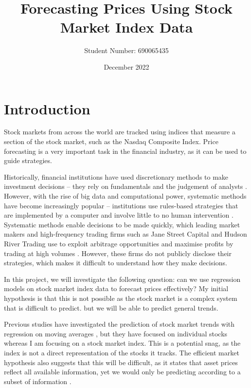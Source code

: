 \documentclass[a4paper, 11pt]{article}
\begin{document}
\title{Forecasting Prices Using Stock Market Index Data}
\author{Student Number: 690065435}
\date{December 2022}
\maketitle

\section{Introduction}
Stock markets from across the world are tracked using indices that measure a section of the stock market, such as the Nasdaq Composite Index. Price forecasting is a very important task in the financial industry, as it can be used to guide strategies.

Historically, financial institutions have used discretionary methods to make investment decisions -- they rely on fundamentals and the judgement of analysts \cite{harvey2017man}. However, with the rise of big data and computational power, systematic methods have become increasingly popular -- institutions use rules-based strategies that are implemented by a computer and involve little to no human intervention \cite{harvey2017man}. Systematic methods enable decisions to be made quickly, which leading market makers and high-frequency trading firms such as Jane Street Capital and Hudson River Trading use to exploit arbitrage opportunities and maximise profits by trading at high volumes \cite{aldridge2013high}. However, these firms do not publicly disclose their strategies, which makes it difficult to understand how they make decisions.

In this project, we will investigate the following question: can we use regression models on stock market index data to forecast prices effectively? My initial hypothesis is that this is not possible as the stock market is a complex system that is difficult to predict. but we will be able to predict general trends.

Previous studies have investigated the prediction of stock market trends with regression on moving averages \cite{dinesh2021prediction}, but they have focused on individual stocks whereas I am focusing on a stock market index. This is a potential snag, as the index is not a direct representation of the stocks it tracks. The efficient market hypothesis also suggests that this will be difficult, as it states that asset prices reflect all available information, yet we would only be predicting according to a subset of information \cite{fama1970efficient}. 
\end{document}
